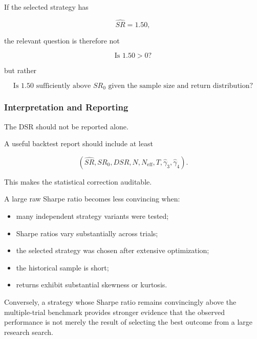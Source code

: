 \documentclass[11pt,a4paper]{article}
\begin{document}
If the selected strategy has

\begin{equation}
\widehat{SR}=1.50,
\end{equation}

the relevant question is therefore not

\begin{equation}
\boxed{
\text{Is }1.50>0?
}
\end{equation}

but rather

\begin{equation}
\boxed{
\text{Is }1.50\text{ sufficiently above }SR_0
\text{ given the sample size and return distribution?}
}
\end{equation}


\subsubsection{Interpretation and Reporting}

The DSR should not be reported alone.

A useful backtest report should include at least

\begin{equation}
\boxed{
\left(
\widehat{SR},
SR_0,
DSR,
N,
N_{\mathrm{eff}},
T,
\widehat{\gamma}_3,
\widehat{\gamma}_4
\right).
}
\end{equation}

This makes the statistical correction auditable.

A large raw Sharpe ratio becomes less convincing when:

\begin{itemize}
    \item many independent strategy variants were tested;
    \item Sharpe ratios vary substantially across trials;
    \item the selected strategy was chosen after extensive optimization;
    \item the historical sample is short;
    \item returns exhibit substantial skewness or kurtosis.
\end{itemize}

Conversely, a strategy whose Sharpe ratio remains convincingly above the
multiple-trial benchmark provides stronger evidence that the observed
performance is not merely the result of selecting the best outcome from a large
research search.
\end{document}
